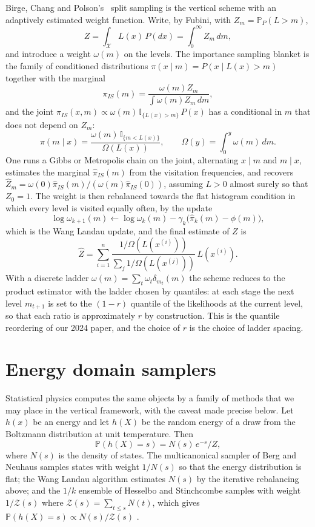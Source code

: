 \documentclass[11pt,twoside,openany]{book}
\theoremstyle{plain}
\theoremstyle{definition}
\theoremstyle{remark}
\newcommand{\PP}{\mathbb{P}}
\newcommand{\Ind}{\mathbb{I}}
\newcommand{\cX}{\mathcal{X}}
\begin{document}
Birge, Chang and Polson's~\cite{BCP} split sampling is the vertical scheme with an adaptively estimated weight function. Write, by Fubini, with $Z_m = \PP_P(L > m)$,
\[
Z = \int_\cX L(x) \, P(dx) = \int_0^\infty Z_m \, dm ,
\]
and introduce a weight $\omega(m)$ on the levels. The importance sampling blanket is the family of conditioned distributions $\pi(x \mid m) = P(x \mid L(x) > m)$ together with the marginal
\[
\pi_{IS}(m) = \frac{\omega(m) Z_m}{\int \omega(m) Z_m \, dm} ,
\]
and the joint $\pi_{IS}(x, m) \propto \omega(m) \, \Ind_{\{L(x) > m\}} \, P(x)$ has a conditional in $m$ that does not depend on $Z_m$:
\[
\pi(m \mid x) = \frac{\omega(m) \, \Ind_{\{m < L(x)\}}}{\Omega(L(x))} , \qquad \Omega(y) = \int_0^y \omega(m) \, dm .
\]
One runs a Gibbs or Metropolis chain on the joint, alternating $x \mid m$ and $m \mid x$, estimates the marginal $\hat\pi_{IS}(m)$ from the visitation frequencies, and recovers $\hat Z_m = \omega(0) \hat\pi_{IS}(m) / (\omega(m) \hat\pi_{IS}(0))$, assuming $L > 0$ almost surely so that $Z_0 = 1$. The weight is then rebalanced towards the flat histogram condition in which every level is visited equally often, by the update
\[
\log \omega_{k+1}(m) \leftarrow \log \omega_k(m) - \gamma_k \big( \hat\pi_k(m) - \phi(m) \big) ,
\]
which is the Wang Landau update, and the final estimate of $Z$ is
\[
\hat Z = \sum_{i=1}^{n} \frac{1/\Omega(L(x^{(i)}))}{\sum_j 1/\Omega(L(x^{(j)}))} \, L(x^{(i)}) .
\]
With a discrete ladder $\omega(m) = \sum_t \omega_t \delta_{m_t}(m)$ the scheme reduces to the product estimator with the ladder chosen by quantiles: at each stage the next level $m_{t+1}$ is set to the $(1 - r)$ quantile of the likelihoods at the current level, so that each ratio is approximately $r$ by construction. This is the quantile reordering of our 2024 paper, and the choice of $r$ is the choice of ladder spacing.

\section{Energy domain samplers}

Statistical physics computes the same objects by a family of methods that we may place in the vertical framework, with the caveat made precise below. Let $h(x)$ be an energy and let $h(X)$ be the random energy of a draw from the Boltzmann distribution at unit temperature. Then
\[
\PP(h(X) = s) = N(s) \, e^{-s} / Z ,
\]
where $N(s)$ is the density of states. The multicanonical sampler of Berg and Neuhaus samples states with weight $1 / N(s)$ so that the energy distribution is flat; the Wang Landau algorithm estimates $N(s)$ by the iterative rebalancing above; and the $1/k$ ensemble of Hesselbo and Stinchcombe samples with weight $1 / \mathcal{Z}(s)$ where $\mathcal{Z}(s) = \sum_{t \le s} N(t)$, which gives $\PP(h(X) = s) \propto N(s) / \mathcal{Z}(s)$ .
\end{document}
